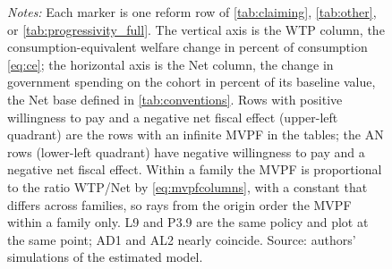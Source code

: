 \begin{figure}[!t]

\vspace{2pt}

\begin{minipage}{0.92\textwidth}
\vspace{4pt}
\scriptsize
\textit{Notes:} Each marker is one reform row of \autoref{tab:claiming}, \autoref{tab:other}, or \autoref{tab:progressivity_full}. The vertical axis is the WTP column, the consumption-equivalent welfare change in percent of consumption \eqref{eq:ce}; the horizontal axis is the Net column, the change in government spending on the cohort in percent of its baseline value, the Net base defined in \autoref{tab:conventions}. Rows with positive willingness to pay and a negative net fiscal effect (upper-left quadrant) are the rows with an infinite MVPF in the tables; the AN rows (lower-left quadrant) have negative willingness to pay and a negative net fiscal effect. Within a family the MVPF is proportional to the ratio WTP/Net by \eqref{eq:mvpfcolumns}, with a constant that differs across families, so rays from the origin order the MVPF within a family only. L9 and P3.9 are the same policy and plot at the same point; AD1 and AL2 nearly coincide. Source: authors' simulations of the estimated model.
\end{minipage}
\end{figure}
